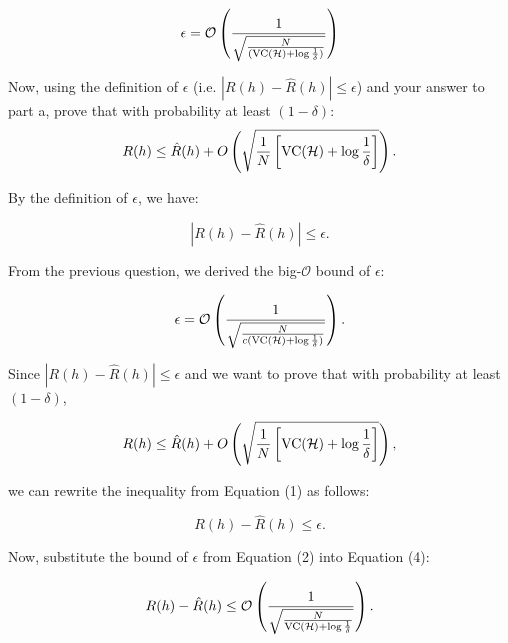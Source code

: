 \documentclass[11pt,addpoints,answers]{exam}
\begin{document}
\begin{questions}
\begin{parts}
\begin{subparts}
    \begin{your_solution}[height=8cm]
$$\epsilon = \mathcal{O}\left(\frac{1}{\sqrt{\frac{N}{(\text{VC}(\mathcal{H}) + \log \frac{1}{\delta})}}}\right)$$
    \end{your_solution}
    
    
    \subpart[2] Now, using the definition of $\epsilon$ (i.e. $|R(h) - \hat{R}(h)| \le \epsilon$) and your answer to part a, prove that with probability at least $(1-\delta)$: $$R(h) \le \hat{R}(h) + O\left(\sqrt{\frac{1}{N} \left[\text{VC}(\mathcal{H}) + \log\frac{1}{\delta} \right]} \right).$$
    \begin{your_solution}[height=20cm]
    By the definition of $\epsilon$, we have:

    \begin{equation}
    |R(h) - \hat{R}(h)| \le \epsilon.
    \end{equation}
    
    From the previous question, we derived the big-$\mathcal{O}$ bound of $\epsilon$:
    
    \begin{equation}
    \epsilon = \mathcal{O}\left(\frac{1}{\sqrt{\frac{N}{c(\text{VC}(\mathcal{H}) + \log \frac{1}{\delta})}}}\right).
    \end{equation}
    
    Since $|R(h) - \hat{R}(h)| \le \epsilon$ and we want to prove that with probability at least $(1-\delta)$,
    
    \begin{equation}
    R(h) \le \hat{R}(h) + O\left(\sqrt{\frac{1}{N} \left[\text{VC}(\mathcal{H}) + \log\frac{1}{\delta} \right]} \right),
    \end{equation}
    
    we can rewrite the inequality from Equation (1) as follows:
    
    \begin{equation}
    R(h) - \hat{R}(h) \le \epsilon.
    \end{equation}
    
    Now, substitute the bound of $\epsilon$ from Equation (2) into Equation (4):
    
    \begin{equation}
    R(h) - \hat{R}(h) \le \mathcal{O}\left(\frac{1}{\sqrt{\frac{N}{\text{VC}(\mathcal{H}) + \log \frac{1}{\delta}}}}\right).
    \end{equation}
    

\end{your_solution}
\end{subparts}
\end{parts}
\end{questions}
\end{document}
